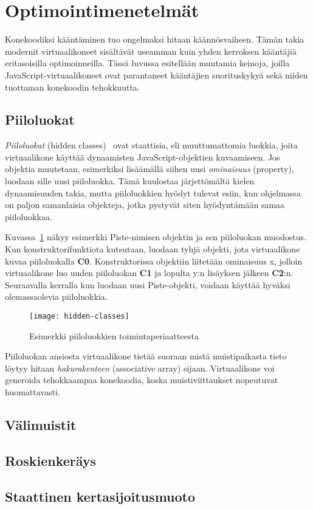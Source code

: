 \section{Optimointimenetelmät}

Konekoodiksi kääntäminen tuo ongelmaksi hitaan käännösvaiheen. Tämän takia modernit virtuaalikoneet sisältävät useamman kuin yhden kerroksen kääntäjiä eritasoisilla optimoinneilla. Tässä luvussa esitellään muutamia keinoja, joilla JavaScript-virtuaalikoneet ovat parantaneet kääntäjien suorituskykyä sekä niiden tuottaman konekoodin tehokkuutta.

\subsection{Piiloluokat}

\textit{Piiloluokat} (hidden classes)~\cite{v8design} ovat staattisia, eli muuttumattomia luokkia, joita virtuaalikone käyttää dynaamisten JavaScript-objektien kuvaamiseen. Jos objektia muutetaan, esimerkiksi lisäämällä siihen uusi \textit{ominaisuus} (property), luodaan sille uusi piiloluokka. Tämä kuulostaa järjettömältä kielen dynaamisuuden takia, mutta piiloluokkien hyödyt tulevat esiin, kun ohjelmassa on paljon samanlaisia objekteja, jotka pystyvät siten hyödyntämään samaa piiloluokkaa.

Kuvassa~\ref{fig:hiddenclass} näkyy esimerkki Piste-nimisen objektin ja sen piiloluokan muodostus. Kun konstruktorifunktiota kutsutaan, luodaan tyhjä objekti, jota virtuaalikone kuvaa piiloluokalla \textbf{C0}. Konstruktorissa objektiin liitetään ominaisuus x, jolloin virtuaalikone luo uuden piiloluokan \textbf{C1} ja lopulta y:n lisäyksen jälkeen \textbf{C2}:n. Seuraavalla kerralla kun luodaan uusi Piste-objekti, voidaan käyttää hyväksi olemassaolevia piiloluokkia.

\begin{figure}[ht]
    \texttt{[image: hidden-classes]}
    \caption{Esimerkki piiloluokkien toimintaperiaatteesta}
     \centering
     \label{fig:hiddenclass}
\end{figure}

Piiloluokan ansiosta virtuaalikone tietää suoraan mistä muistipaikasta tieto löytyy hitaan \textit{hakurakenteen} (associative array) sijaan. Virtuaalikone voi generoida tehokkaampaa konekoodia, koska muistiviittaukset nopeutuvat huomattavasti.

\subsection{Välimuistit}


\subsection{Roskienkeräys}


\subsection{Staattinen kertasijoitusmuoto}

